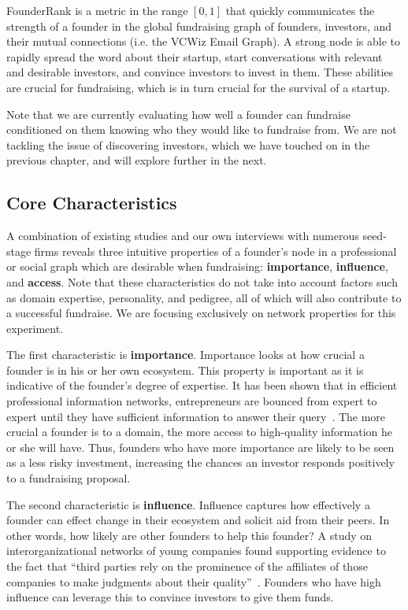 FounderRank is a metric in the range $[0, 1]$ that quickly communicates the strength of a founder in the global fundraising graph of founders, investors, and their mutual connections (i.e. the VCWiz Email Graph). A strong node is able to rapidly spread the word about their startup, start conversations with relevant and desirable investors, and convince investors to invest in them. These abilities are crucial for fundraising, which is in turn crucial for the survival of a startup.

Note that we are currently evaluating how well a founder can fundraise conditioned on them knowing who they would like to fundraise from. We are not tackling the issue of discovering investors, which we have touched on in the previous chapter, and will explore further in the next.

\subsection{Core Characteristics}

A combination of existing studies and our own interviews with numerous seed-stage firms reveals three intuitive properties of a founder's node in a professional or social graph which are desirable when fundraising: \textbf{importance}, \textbf{influence}, and \textbf{access}. Note that these characteristics do not take into account factors such as domain expertise, personality, and pedigree, all of which will also contribute to a successful fundraise. We are focusing exclusively on network properties for this experiment.

The first characteristic is \textbf{importance}. Importance looks at how crucial a founder is in his or her own ecosystem. This property is important as it is indicative of the founder's degree of expertise. It has been shown that in efficient professional information networks, entrepreneurs are bounced from expert to expert until they have sufficient information to answer their query~\cite{BIRLEY1985107}. The more crucial a founder is to a domain, the more access to high-quality information he or she will have. Thus, founders who have more importance are likely to be seen as a less risky investment, increasing the chances an investor responds positively to a fundraising proposal.

The second characteristic is \textbf{influence}. Influence captures how effectively a founder can effect change in their ecosystem and solicit aid from their peers. In other words, how likely are other founders to help this founder? A study on interorganizational networks of young companies found supporting evidence to the fact that ``third parties rely on the prominence of the affiliates of those companies to make judgments about their quality''~\cite{10.2307/2666998}. Founders who have high influence can leverage this to convince investors to give them funds.

